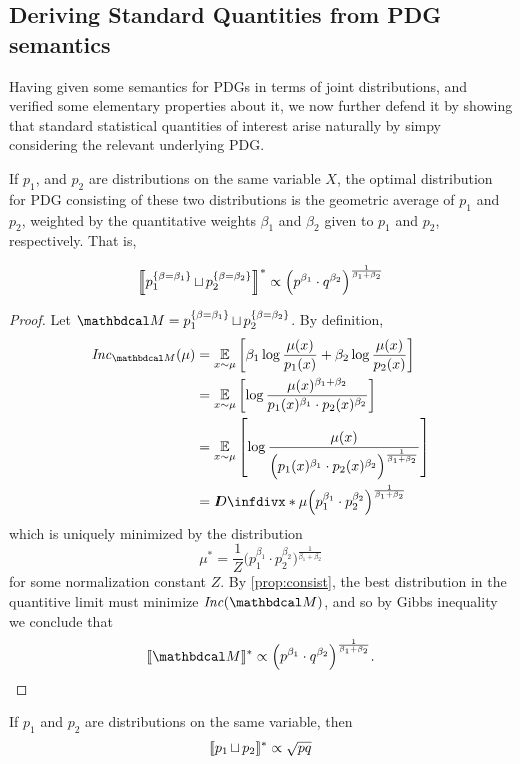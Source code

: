 \documentclass[the-pdg-manual.tex]{subfiles}
\begin{document}
	\subsection{Deriving Standard Quantities from PDG semantics}
	
	Having given some semantics for PDGs in terms of joint distributions, and verified some elementary properties about it, we now further defend it by showing that standard statistical quantities of interest arise naturally by simpy considering the relevant underlying PDG. 
	
	\begin{prop}
		If $p_1$, and $p_2$ are distributions on the same variable $X$, the optimal distribution for PDG consisting of these two distributions is the geometric average of $p_1$ and $p_2$, weighted by the quantitative weights $\beta_1$ and $\beta_2$ given to $p_1$ and $p_2$, respectively. That is,
		
		\[ \bbr*{p_1 ^{\{\beta = \beta_1 \}} \bundle p_2 ^{\{\beta = \beta_2 \}}}^* \propto \Big(p^{\beta_1} \cdot q^{\beta_2}\Big)^{\frac{1}{\beta_1+\beta_2}} \]
	\end{prop}
	\begin{proof}
		Let $\dg M = p_1 ^{\{\beta = \beta_1 \}} \bundle p_2 ^{\{\beta = \beta_2 \}}$.
		By definition, 
		\begin{align*}
		 	\Inc_{\dg M} (\mu) &= \Ex_{x \sim \mu} \left[ \beta_1 \log \frac{\mu(x)}{p_1(x)} + \beta_2 \log \frac{\mu(x)}{p_2(x)} \right] \\
				&= \Ex_{x \sim \mu} \left[ \log \frac{\mu(x)^{\beta_1 + \beta_2}}{p_1(x)^{\beta_1}\cdot p_2(x)^{\beta_2}} \right] \\
				&= \Ex_{x \sim \mu} \left[ \log \frac{\mu(x)}{\Big( p_1(x)^{\beta_1}\cdot p_2(x)^{\beta_2} \Big)^{\frac{1}{\beta_1+\beta_2}}} \right] \\
				&= \kldiv*{\mu}{\Big( p_1^{\beta_1}\cdot p_2^{\beta_2} \Big)^{\frac{1}{\beta_1+\beta_2}}}
		\end{align*}
		which is uniquely minimized by the distribution
		\[ \mu^* = \frac1Z \Big( p_1^{\beta_1}\cdot p_2^{\beta_2} \Big)^{\frac{1}{\beta_1+\beta_2}} \]
		for some normalization constant $Z$. By \cref{prop:consist}, the best distribution in the quantitive limit must minimize $\Inc(\dg M)$, and so by Gibbs inequality we conclude that
		\[ \bbr{\dg M}^* \propto \Big(p^{\beta_1} \cdot q^{\beta_2}\Big)^{\frac{1}{\beta_1+\beta_2}}. \]
	\end{proof}
	
	\begin{coro}
		If $p_1$ and $p_2$ are distributions on the same variable, then
		\[ \bbr{p_1 \bundle p_2 }^* \propto \sqrt{ p  q } \]
	\end{coro}
	
\end{document}
